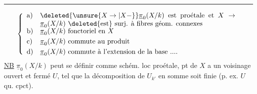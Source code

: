 \par\noindent\rule{.20\linewidth}{.4pt}\par
\[
\left\{\begin{array}{ll}
\text{a)} & \parbox[t]{.82\linewidth}{$\deleted{\unsure{X\to|X-}}\underline{\pi}_0(X/k)$ est proétale et $X\to\underline{\pi}_0(X/k)$ \deleted{est} surj. à fibres géom. connexes}\\[.7ex]
\text{b)} & \underline{\pi}_0(X/k)\ \text{fonctoriel en }X\\[.7ex]
\text{c)} & \underline{\pi}_0(X/k)\ \text{commute au produit}\\[.7ex]
\text{d)} & \underline{\pi}_0(X/k)\ \text{commute à l'extension de la base ....}
\end{array}\right.
\]
\uline{NB} $\underline{\pi}_0(X/k)$ peut se définir comme schém. loc proétale,   pt de  $X$ a un voisinage ouvert et fermé $U$, tel que  la décomposition de $U_{k'}$ en somme   soit finie (p. ex. $U$ qu. cpct).

